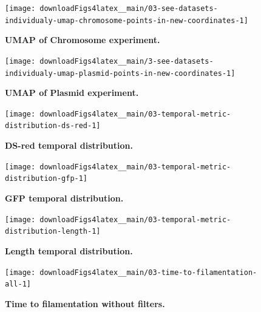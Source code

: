 \documentclass[a4paper, nobind]{templates/ociamthesis}
\begin{document}
\begin{figure}[H]
\texttt{[image: downloadFigs4latex\_\_main/03-see-datasets-individualy-umap-chromosome-points-in-new-coordinates-1]} \caption[UMAP of Chromosome experiment.]{\textbf{UMAP of Chromosome experiment.}}\label{fig:03-see-datasets-individualy-umap-chromosome-points-in-new-coordinates-1}
\end{figure}





\begin{figure}[H]
\texttt{[image: downloadFigs4latex\_\_main/3-see-datasets-individualy-umap-plasmid-points-in-new-coordinates-1]} \caption[UMAP of Plasmid experiment.]{\textbf{UMAP of Plasmid experiment.}}\label{fig:3-see-datasets-individualy-umap-plasmid-points-in-new-coordinates-1}
\end{figure}





\begin{figure}[H]
\texttt{[image: downloadFigs4latex\_\_main/03-temporal-metric-distribution-ds-red-1]} \caption[DS-red temporal distribution.]{\textbf{DS-red temporal distribution.}}\label{fig:03-temporal-metric-distribution-ds-red-1}
\end{figure}





\begin{figure}[H]
\texttt{[image: downloadFigs4latex\_\_main/03-temporal-metric-distribution-gfp-1]} \caption[GFP temporal distribution.]{\textbf{GFP temporal distribution.}}\label{fig:03-temporal-metric-distribution-gfp-1}
\end{figure}





\begin{figure}[H]
\texttt{[image: downloadFigs4latex\_\_main/03-temporal-metric-distribution-length-1]} \caption[Length temporal distribution.]{\textbf{Length temporal distribution.}}\label{fig:03-temporal-metric-distribution-length-1}
\end{figure}





\begin{figure}[H]
\texttt{[image: downloadFigs4latex\_\_main/03-time-to-filamentation-all-1]} \caption[Time to filamentation without filters.]{\textbf{Time to filamentation without filters.}}\label{fig:03-time-to-filamentation-all-1}
\end{figure}
\end{document}
